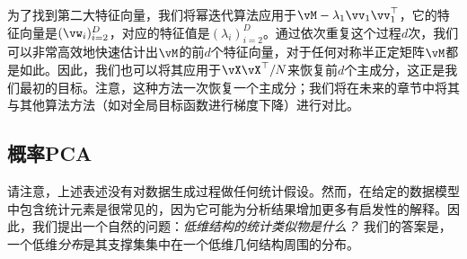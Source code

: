 \documentclass[../../book-main_zh.tex]{subfiles}
\begin{document}

为了找到第二大特征向量，我们将幂迭代算法应用于\(\vM - \lambda_{1}\vv_{1}\vv_{1}^{\top}\)，它的特征向量是\((\vw_{i})_{i = 2}^{D}\)，对应的特征值是\((\lambda_{i})_{i = 2}^{D}\)。通过依次重复这个过程\(d\)次，我们可以非常高效地快速估计出\(\vM\)的前\(d\)个特征向量，对于任何对称半正定矩阵\(\vM\)都是如此。因此，我们也可以将其应用于\(\vX\vX^{\top}/N\)来恢复前\(d\)个主成分，这正是我们最初的目标。注意，这种方法一次恢复一个主成分；我们将在未来的章节中将其与其他算法方法（如对全局目标函数进行梯度下降）进行对比。





\subsection{概率PCA}\label{subsec:probabilistic PCA}

请注意，上述表述没有对数据生成过程做任何统计假设。然而，在给定的数据模型中包含统计元素是很常见的，因为它可能为分析结果增加更多有启发性的解释。因此，我们提出一个自然的问题：\textit{低维结构的统计类似物是什么？} 我们的答案是，一个低维\textit{分布}是其支撑集集中在一个低维几何结构周围的分布。
\end{document}
